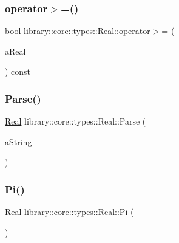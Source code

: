 \mbox{\label{classlibrary_1_1core_1_1types_1_1_real_aa36e6de2ef7bc2d234be64417d36013d}} 
\subsubsection{\texorpdfstring{operator$>$=()}{operator>=()}\hspace{0.1cm}{\footnotesize\ttfamily [2/2]}}
{\footnotesize\ttfamily bool library\+::core\+::types\+::\+Real\+::operator$>$= (\begin{DoxyParamCaption}\item[{const \hyperlink{classlibrary_1_1core_1_1types_1_1_real_a9c5c8826b7e5a8e39544d23fea6c0e1c}{Real\+::\+Value\+Type} \&}]{a\+Real }\end{DoxyParamCaption}) const}

\mbox{\label{classlibrary_1_1core_1_1types_1_1_real_a7ec624abaddba3a9cabf094a6a69f484}} 
\subsubsection{\texorpdfstring{Parse()}{Parse()}}
{\footnotesize\ttfamily \hyperlink{classlibrary_1_1core_1_1types_1_1_real}{Real} library\+::core\+::types\+::\+Real\+::\+Parse (\begin{DoxyParamCaption}\item[{const \hyperlink{classlibrary_1_1core_1_1types_1_1_string}{types\+::\+String} \&}]{a\+String }\end{DoxyParamCaption})\hspace{0.3cm}{\ttfamily [static]}}

\mbox{\label{classlibrary_1_1core_1_1types_1_1_real_a264dc174766742ebfc88c87a72d8fe34}} 
\subsubsection{\texorpdfstring{Pi()}{Pi()}}
{\footnotesize\ttfamily \hyperlink{classlibrary_1_1core_1_1types_1_1_real}{Real} library\+::core\+::types\+::\+Real\+::\+Pi (\begin{DoxyParamCaption}{ }\end{DoxyParamCaption})\hspace{0.3cm}{\ttfamily [static]}}

